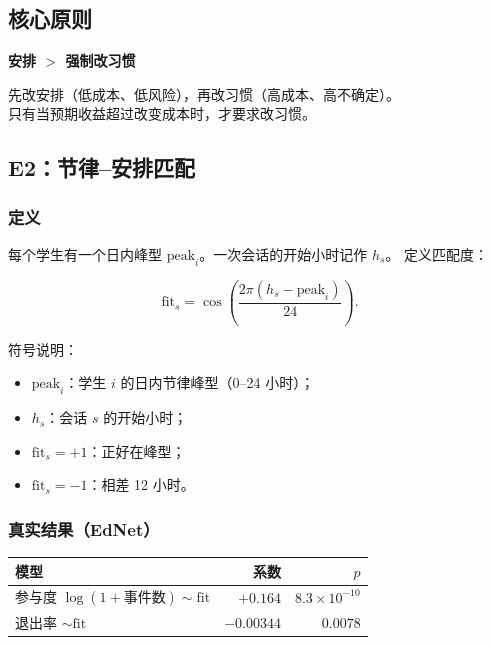 \documentclass[UTF8,a4paper,11pt]{ctexart}
\newenvironment{explainbox}[1]
{\begin{center}\begin{minipage}{0.94\textwidth}\colorbox{boxbg}{\parbox{0.92\textwidth}{\textbf{#1}\par\vspace{2pt}}}}
{\end{minipage}\end{center}}
\begin{document}
\subsection{核心原则}

\begin{explainbox}{安排 $>$ 强制改习惯}
先改安排（低成本、低风险），再改习惯（高成本、高不确定）。\\
只有当预期收益超过改变成本时，才要求改习惯。
\end{explainbox}

\subsection{E2：节律--安排匹配}

\subsubsection{定义}

每个学生有一个日内峰型 $\text{peak}_i$。一次会话的开始小时记作 $h_s$。
定义匹配度：

\begin{equation}
\mathrm{fit}_s=
\cos\left(\frac{2\pi(h_s-\text{peak}_i)}{24}\right).
\end{equation}

符号说明：

\begin{itemize}[leftmargin=2em]
\item $\text{peak}_i$：学生 $i$ 的日内节律峰型（0--24 小时）；
\item $h_s$：会话 $s$ 的开始小时；
\item $\mathrm{fit}_s=+1$：正好在峰型；
\item $\mathrm{fit}_s=-1$：相差 12 小时。
\end{itemize}

\subsubsection{真实结果（EdNet）}

\begin{center}
\begin{longtable}{@{}lrr@{}}
\toprule
\textbf{模型} & \textbf{系数} & \textbf{$p$} \\
\midrule
参与度 $\log(1+\text{事件数})\sim\mathrm{fit}$ & $+0.164$ & $8.3\times10^{-10}$ \\
退出率 $\sim\mathrm{fit}$ & $-0.00344$ & $0.0078$ \\
\bottomrule
\end{longtable}
\end{center}
\end{document}
